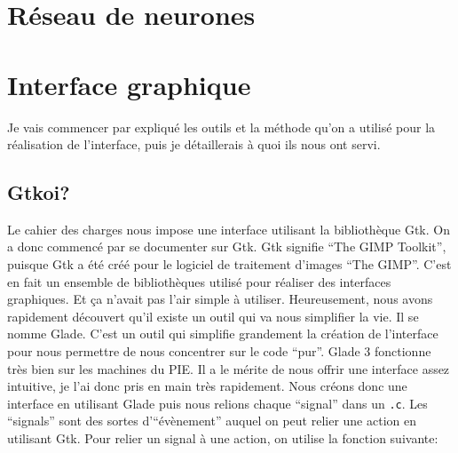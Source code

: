 \documentclass[]{report}
\begin{document}



	\chapter{R\'eseau de neurones} %
	\label{cha:r'eseau_de_neurones}




	\chapter{Interface graphique} %
	\label{cha:interface_graphique}
	Je vais commencer par expliqu\'e les outils et la m\'ethode qu'on a utilis\'e pour la r\'ealisation de l'interface, puis je d\'etaillerais \`a quoi ils nous ont servi.
		\section{Gtkoi?} %
		\label{sec:gtkoi_}
			Le cahier des charges nous impose une interface utilisant la biblioth\`eque Gtk. On a donc commenc\'e par se documenter sur Gtk.
			Gtk signifie ``The GIMP Toolkit'', puisque Gtk a \'et\'e cr\'e\'e pour le logiciel de traitement d'images ``The GIMP''. C'est en fait un ensemble de biblioth\`eques utilis\'e pour r\'ealiser des interfaces graphiques. Et \c ca n'avait pas l'air simple \`a utiliser.
			Heureusement, nous avons rapidement d\'ecouvert qu'il existe un outil qui va nous simplifier la vie. Il se nomme Glade. C'est un outil qui simplifie grandement la cr\'eation de l'interface pour nous permettre de nous concentrer sur le code ``pur''. Glade 3 fonctionne tr\`es bien sur les machines du PIE. Il a le m\'erite de nous offrir une interface assez intuitive, je l'ai donc pris en main tr\`es rapidement.
			Nous cr\'eons donc une interface en utilisant Glade puis nous relions chaque ``signal'' dans un \texttt{.c}. Les ``signals'' sont des sortes d'``\'ev\`enement'' auquel on peut relier une action en utilisant Gtk.
			Pour relier un signal \`a une action, on utilise la fonction suivante:
\end{document}
